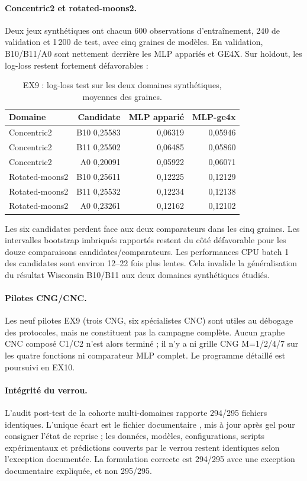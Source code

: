 \documentclass[11pt,a4paper]{article}
\newcommand{\fichier}[1]{\path{#1}}
\begin{document}
\paragraph{Concentric2 et rotated-moons2.} Deux jeux synthétiques ont chacun 600 observations d'entraînement, 240 de validation et 1\,200 de test, avec cinq graines de modèles. En validation, B10/B11/A0 sont nettement derrière les MLP appariés et GE4X. Sur holdout, les log-loss restent fortement défavorables :
\begin{table}[H]
\centering\small
\caption{EX9 : log-loss test sur les deux domaines synthétiques, moyennes des graines.}
\begin{tabularx}{\textwidth}{lrrr}
\toprule
Domaine & Candidate & MLP apparié & MLP-ge4x\\
\midrule
Concentric2 & B10 0,25583 & 0,06319 & 0,05946\\
Concentric2 & B11 0,25502 & 0,06485 & 0,05860\\
Concentric2 & A0 0,20091 & 0,05922 & 0,06071\\
Rotated-moons2 & B10 0,25611 & 0,12225 & 0,12129\\
Rotated-moons2 & B11 0,25532 & 0,12234 & 0,12138\\
Rotated-moons2 & A0 0,23261 & 0,12162 & 0,12102\\
\bottomrule
\end{tabularx}
\end{table}
Les six candidates perdent face aux deux comparateurs dans les cinq graines. Les intervalles bootstrap imbriqués rapportés restent du côté défavorable pour les douze comparaisons candidates/comparateurs. Les performances CPU batch 1 des candidates sont environ 12--22 fois plus lentes. Cela invalide la généralisation du résultat Wisconsin B10/B11 aux deux domaines synthétiques étudiés.

\paragraph{Pilotes CNG/CNC.} Les neuf pilotes EX9 (trois CNG, six spécialistes CNC) sont utiles au débogage des protocoles, mais ne constituent pas la campagne complète. Aucun graphe CNC composé C1/C2 n'est alors terminé ; il n'y a ni grille CNG M=1/2/4/7 sur les quatre fonctions ni comparateur MLP complet. Le programme détaillé est poursuivi en EX10.

\paragraph{Intégrité du verrou.} L'audit post-test de la cohorte multi-domaines rapporte 294/295 fichiers identiques. L'unique écart est le fichier documentaire \fichier{reports/PROMPT_EX9_AUDIT.md}, mis à jour après gel pour consigner l'état de reprise ; les données, modèles, configurations, scripts expérimentaux et prédictions couverts par le verrou restent identiques selon l'exception documentée. La formulation correcte est 294/295 avec une exception documentaire expliquée, et non 295/295.
\end{document}
